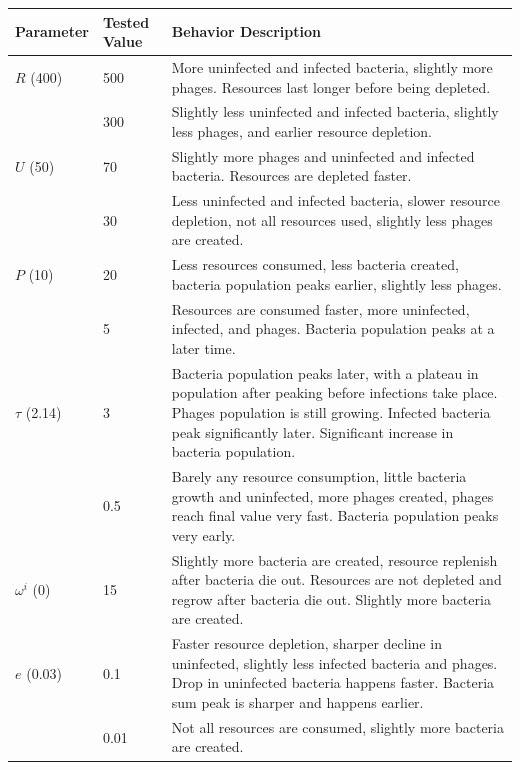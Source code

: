 \begin{table}
    \footnotesize
    \centering
    \begin{tabularx}{\textwidth}{l l X}
        \toprule
        \textbf{Parameter} & \textbf{Tested Value} & \textbf{Behavior Description} \\
        \midrule
        $R$ (400) & 500 & More uninfected and infected bacteria, slightly more phages. Resources last longer before being depleted. \\
         & 300 & Slightly less uninfected and infected bacteria, slightly less phages, and earlier resource depletion. \\

        \midrule
        $U$ (50) & 70 & Slightly more phages and uninfected and infected bacteria. Resources are depleted faster. \\
         & 30 & Less uninfected and infected bacteria, slower resource depletion, not all resources used, slightly less phages are created. \\

        \midrule
        $P$ (10) & 20 & Less resources consumed, less bacteria created, bacteria population peaks earlier, slightly less phages.\\
         & 5 & Resources are consumed faster, more uninfected, infected, and phages. Bacteria population peaks at a later time. \\

        \midrule
        $\tau$ (2.14) & 3 & Bacteria population peaks later, with a plateau in population after peaking before infections take place. Phages population is still growing. Infected bacteria peak significantly later. Significant increase in bacteria population. \\
         & 0.5& Barely any resource consumption, little bacteria growth and uninfected, more phages created, phages reach final value very fast. Bacteria population peaks very early. \\

        \midrule
        $\omega^i$ (0) & 15 & Slightly more bacteria are created, resource replenish after bacteria die out. Resources are not depleted and regrow after bacteria die out. Slightly more bacteria are created. \\

        \midrule
        $e$ (0.03) & 0.1 & Faster resource depletion, sharper decline in uninfected, slightly less infected bacteria and phages. Drop in uninfected bacteria happens faster. Bacteria sum peak is sharper and happens earlier. \\
         & 0.01 & Not all resources are consumed, slightly more bacteria are created. \\


\end{tabularx}
\end{table}
